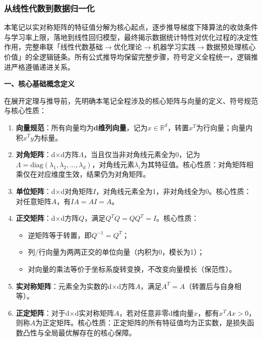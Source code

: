 \documentclass[10pt]{article}
\numberwithin{equation}{section}
\theoremstyle{plain}
\theoremstyle{definition}
\theoremstyle{remark}
\begin{document}
\subsubsection{从线性代数到数据归一化}

\begin{RemarkBox}[笔记说明]
本笔记以实对称矩阵的特征值分解为核心起点，逐步推导梯度下降算法的收敛条件与学习率上限，落地到线性回归模型，最终揭示数据统计特性对优化过程的决定性作用，完整串联「线性代数基础$\rightarrow$优化理论$\rightarrow$机器学习实践$\rightarrow$数据预处理核心价值」的全逻辑链条。所有公式推导均保留完整步骤，符号定义全程统一，逻辑推进严格遵循递进关系。
\end{RemarkBox}

{\par\vspace{1ex}\noindent\large\bfseries\color{brandD} 一、核心基础概念定义\par}\par\vspace{0.5ex}
在展开定理与推导前，先明确本笔记全程涉及的核心矩阵与向量的定义、符号规范与核心性质：
\begin{enumerate}[label=\arabic*., leftmargin=*]
    \item \textbf{向量规范}：所有向量均为\textbf{d维列向量}，记为$x \in \mathbb{R}^d$，转置$x^T$为行向量；向量内积$x^T y$为标量。
    \item \textbf{对角矩阵}：d$\times$d方阵$\Lambda$，当且仅当非对角线元素全为0，记为$\Lambda = \text{diag}(\lambda_1,\lambda_2,\dots,\lambda_d)$，对角线元素$\lambda_i$为其特征值。核心性质：对角矩阵相乘仅在对应维度生效，结果仍为对角矩阵。
    \item \textbf{单位矩阵}：d$\times$d对角矩阵$I$，对角线元素全为1，非对角线全为0。核心性质：对任意矩阵$A$，有$IA=AI=A$。
    \item \textbf{正交矩阵}：d$\times$d方阵$Q$，满足$Q^T Q = Q Q^T = I$。核心性质：
    \begin{itemize}[leftmargin=*,nosep]
        \item 逆矩阵等于转置，即$Q^{-1}=Q^T$；
        \item 列/行向量为两两正交的单位向量（内积为0，模长为1）；
        \item 对向量的乘法等价于坐标系旋转变换，不改变向量模长（保范性）。
    \end{itemize}
    \item \textbf{实对称矩阵}：元素全为实数的d$\times$d方阵$A$，满足$A^T=A$（转置后与自身相等）。
    \item \textbf{正定矩阵}：对于d$\times$d实对称矩阵$A$，若对任意非零d维向量$x$，都有$x^T A x > 0$，则称$A$为正定矩阵。核心性质：正定矩阵的所有特征值均为正实数，是损失函数凸性与全局最优解存在的核心保障。
\end{enumerate}
\end{document}
